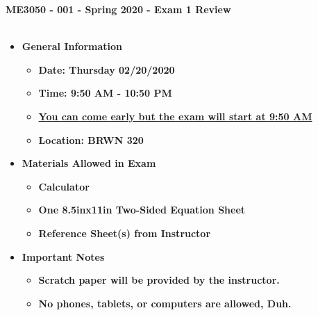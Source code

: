 \documentclass[11pt]{article}
\begin{document}
\textbf{ \LARGE ME3050 - 001 - Spring 2020 - Exam 1 Review  } \\\\

\begin{itemize}
	\item  \textbf{\Large General Information}\\

	\begin{itemize}

		\item  \textbf{\Large Date: Thursday 02/20/2020 }\\
		\item  \textbf{\Large Time: 9:50 AM - 10:50 PM  }\\
		 \item  \textbf{\Large \underline{You can come early but the exam will start at 9:50 AM}}\\
		\item  \textbf{\Large Location: BRWN 320 }\\

	\end{itemize}

		\item  \textbf{\Large Materials Allowed in Exam}\\

	\begin{itemize}

		\item  \textbf{\Large Calculator}\\
		\item  \textbf{\Large One 8.5inx11in Two-Sided Equation Sheet }\\
		\item  \textbf{\Large Reference Sheet(s) from Instructor}\\

	\end{itemize}

\item  \textbf{\Large Important Notes}\\
	\begin{itemize}

		\item  \textbf{\Large Scratch paper will be provided by the instructor.}\\
		\item  \textbf{\Large No phones, tablets, or computers are allowed, Duh.}\\


\end{itemize}
\end{itemize}
\end{document}

